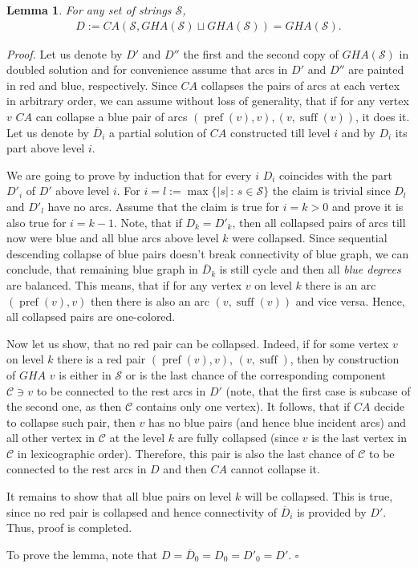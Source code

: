 \documentclass[11pt]{article}
\newtheorem{lem}{Lemma}
\DeclareMathOperator{\suff}{suff}
\DeclareMathOperator{\pref}{pref}
\begin{document}
	\begin{lem}
		For any set of strings $\mathcal{S}$,
		\begin{gather*}
			D := CA(\mathcal{S}, GHA(\mathcal{S}) \sqcup GHA(\mathcal{S})) = GHA(\mathcal{S}).
		\end{gather*}
	\end{lem}
	{\em Proof.} Let us denote by $D'$ and $D''$ the first and the second copy of $GHA(\mathcal{S})$ in doubled solution and for convenience assume that arcs in $D'$ and $D''$ are painted in red and blue, respectively. Since $CA$ collapses the pairs of arcs at each vertex in arbitrary order, we can assume without loss of generality, that if for any vertex $v$ $CA$ can collapse a blue pair of arcs $(\pref(v), v), (v, \suff(v))$, it does it. Let us denote by $\overline{D}_i$ a partial solution of $CA$ constructed till level $i$ and by $D_i$ its part above level $i$. 	
	
	We are going to prove by induction that for every $i$ $D_i$ coincides with the part $D'_i$ of $D'$ above level $i$. For $i = l := \max\{|s| \, : \, s\in\mathcal{S}\}$ the claim is trivial since $D_l$ and $D'_l$ have no arcs. Assume that the claim is true for $i = k > 0$ and prove it is also true for $i = k - 1$. Note, that if $D_k = D'_k$, then all collapsed pairs of arcs till now were blue and all blue arcs above level $k$ were collapsed. Since sequential descending collapse of blue pairs doesn't break connectivity of blue graph, we can conclude, that remaining blue graph in $\overline{D}_k$ is still cycle and then all {\em blue degrees} are balanced. This means, that if for any vertex $v$ on level $k$ there is an arc $(\pref(v), v)$ then there is also an arc $(v, \suff(v))$ and vice versa. Hence, all collapsed pairs are one-colored.
	
	Now let us show, that no red pair can be collapsed. Indeed, if for some vertex $v$ on level $k$ there is a red pair $(\pref(v), v)$, $(v, \suff)$, then by construction of $GHA$ $v$ is either in $\mathcal{S}$ or is the last chance of the corresponding component $\mathcal{C} \ni v$ to be connected to the rest arcs in $D'$ (note, that the first case is subcase of the second one, as then $\mathcal{C}$ contains only one vertex). It follows, that if $CA$ decide to collapse such pair, then $v$ has no blue pairs (and hence blue incident arcs) and all other vertex in $\mathcal{C}$ at the level $k$ are fully collapsed (since $v$ is the last vertex in $\mathcal{C}$ in lexicographic order). Therefore, this pair is also the last chance of $\mathcal{C}$ to be connected to the rest arcs in $D$ and then $CA$ cannot collapse it.
	
	It remains to show that all blue pairs on level $k$ will be collapsed. This is true, since no red pair is collapsed and hence connectivity of $\overline{D}_i$ is provided by $D'$. Thus, proof is completed.
	
	To prove the lemma, note that $D = \overline{D}_0 = D_0 = D'_0 = D'$. $\square$
	
\end{document}
